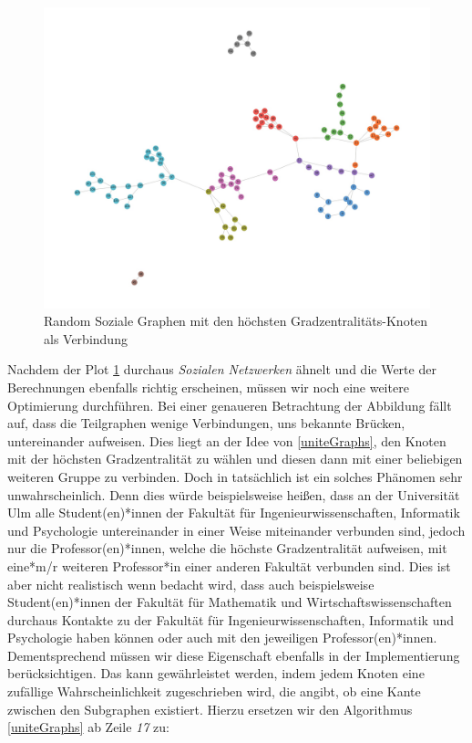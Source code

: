 \FloatBarrier
\begin{figure}[h!]
    \centering
    \hspace*{-1.5cm}
    \includegraphics[width=1.0\textwidth]{Graphics/NearSocialNetwork.jpg}
    \caption{Random Soziale Graphen mit den höchsten Gradzentralitäts-Knoten als Verbindung }
    \label{NearSozialerGraph}
\end{figure}

\newpage
Nachdem der Plot \ref{NearSozialerGraph} durchaus \textit{Sozialen Netzwerken} ähnelt und die Werte der Berechnungen ebenfalls richtig erscheinen, müssen wir noch eine weitere Optimierung durchführen. Bei einer genaueren Betrachtung der Abbildung fällt auf, dass die Teilgraphen wenige Verbindungen, uns bekannte Brücken, untereinander aufweisen. Dies liegt an der Idee von \ref{uniteGraphs}, den Knoten mit der höchsten Gradzentralität zu wählen und diesen dann mit einer beliebigen weiteren Gruppe zu verbinden. Doch in tatsächlich ist ein solches Phänomen sehr unwahrscheinlich. Denn dies würde beispielsweise heißen, dass an der Universität Ulm alle Student(en)*innen der Fakultät für Ingenieurwissenschaften, Informatik und Psychologie untereinander in einer Weise miteinander verbunden sind, jedoch nur die Professor(en)*innen, welche die höchste Gradzentralität aufweisen, mit eine*m/r weiteren Professor*in einer anderen Fakultät verbunden sind. Dies ist aber nicht realistisch wenn bedacht wird, dass auch beispielsweise Student(en)*innen der Fakultät für Mathematik und Wirtschaftswissenschaften durchaus Kontakte zu der Fakultät für Ingenieurwissenschaften, Informatik und Psychologie haben können oder auch mit den jeweiligen Professor(en)*innen. Dementsprechend müssen wir diese Eigenschaft ebenfalls in der Implementierung berücksichtigen. Das kann gewährleistet werden, indem jedem Knoten eine zufällige Wahrscheinlichkeit zugeschrieben wird, die angibt, ob eine Kante zwischen den Subgraphen existiert. Hierzu ersetzen wir den Algorithmus \ref{uniteGraphs} ab Zeile \textit{17} zu:

